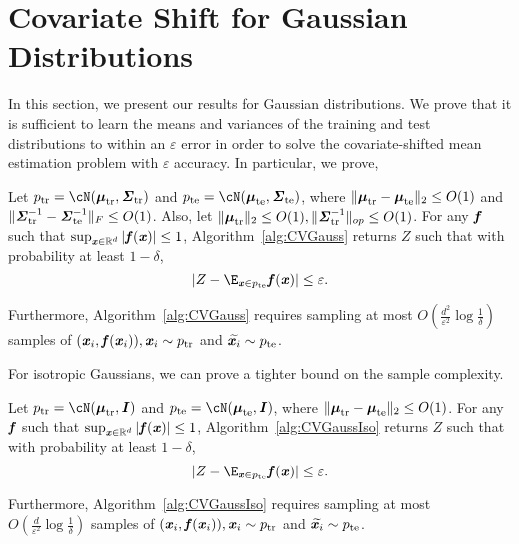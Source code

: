 \section{Covariate Shift for Gaussian Distributions \label{sec:gaussians-optimal}}

In this section, we present our results for Gaussian distributions. We prove that it is sufficient to learn the means and variances of the training and test distributions to within an $\varepsilon$ error in order to solve the covariate-shifted mean estimation problem with $\varepsilon$ accuracy. In particular, we prove,
\begin{theorem}\label{thm:CVGauss}
Let $\ptr = \cN(\mtr,\str)$ and $\pte = \cN(\mte,\ste)$, where $\|\boldsymbol{\mathit{\mu}}_{\mathrm{tr}}-\boldsymbol{\mathit{\mu}}_{\mathrm{te}}\|_2\leq O(1)$ and $\|\boldsymbol{\mathit{\Sigma}}_{\mathrm{tr}}^{-1}-\boldsymbol{\mathit{\Sigma}}_{\mathrm{te}}^{-1}\|_F \leq O(1)$. Also, let $\|\boldsymbol{\mathit{\mu}}_{\mathrm{tr}}\|_2\leq O(1), \|\boldsymbol{\mathit{\Sigma}}_{\mathrm{tr}}^{-1}\|_{op}\leq O(1)$. For any $\boldsymbol{\mathit{f}}$ such that $\sup_{\boldsymbol{\mathit{x}}\in \mathbb{R}^d}|\boldsymbol{\mathit{f}}(\boldsymbol{\mathit{x}})|\leq 1$, Algorithm~\ref{alg:CVGauss} returns $Z$ such that with probability at least $1-\delta$,
\begin{equation}\label{eq:ResGauss}
    |Z-\E_{\xx\in \pte}\ff(\xx)|\leq \varepsilon.
\end{equation}


Furthermore, Algorithm~\ref{alg:CVGauss} requires sampling at most $O\left(\frac{d^2}{\varepsilon^2 }\log\frac{1}{\delta}\right)$ samples of $(\boldsymbol{\mathit{x}}_i,\boldsymbol{\mathit{f}}(\boldsymbol{\mathit{x}}_i)), \boldsymbol{\mathit{x}}_i \sim p_{\mathrm{tr}}$ and $\widetilde{\boldsymbol{\mathit{x}}_i}\sim p_{\mathrm{te}}$. 
\end{theorem}

For isotropic Gaussians, we can prove a tighter bound on the sample complexity.
\begin{theorem}\label{thm:CVGaussIso}
Let $\ptr = \cN(\mtr,\II)$ and $\pte = \cN(\mte,\II)$, where $\|\boldsymbol{\mathit{\mu}}_{\mathrm{tr}}-\boldsymbol{\mathit{\mu}}_{\mathrm{te}}\|_2\leq O(1)$. For any $\boldsymbol{\mathit{f}}$ such that $\sup_{\boldsymbol{\mathit{x}}\in \mathbb{R}^d}|\boldsymbol{\mathit{f}}(\boldsymbol{\mathit{x}})|\leq 1$, Algorithm~\ref{alg:CVGaussIso} returns $Z$ such that with probability at least $1-\delta$,
\begin{equation}\label{eq:ResGaussIso}
    |Z-\E_{\xx\in \pte}\ff(\xx)|\leq \varepsilon.
\end{equation}


Furthermore, Algorithm~\ref{alg:CVGaussIso} requires sampling at most $O\left(\frac{d}{\varepsilon^2 }\log\frac{1}{\delta}\right)$ samples of $(\boldsymbol{\mathit{x}}_i,\boldsymbol{\mathit{f}}(\boldsymbol{\mathit{x}}_i)), \boldsymbol{\mathit{x}}_i \sim p_{\mathrm{tr}}$ and $\widetilde{\boldsymbol{\mathit{x}}_i}\sim p_{\mathrm{te}}$.
\end{theorem}

